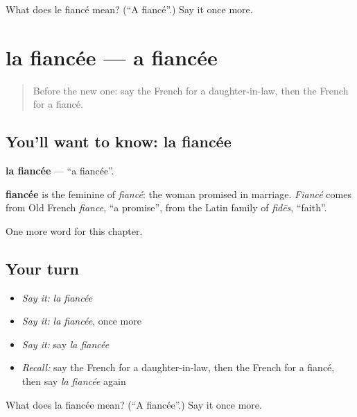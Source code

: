 \begin{tcolorbox}[breakable,colback=teal!4,colframe=teal!35!black,title={Before you move on}]
What does le fiancé mean? (\textquotedblleft{}A fiancé\textquotedblright{}.) Say it once more.
\end{tcolorbox}
\section[la fiancée]{la fiancée — a fiancée}

\label{lesson:FR-C167-fiancee}



\begin{quote}
Before the new one: say the French for a daughter-in-law, then the French for a fiancé.
\end{quote}

\subsection*{You'll want to know: la fiancée}
\textbf{la fiancée} — \textquotedblleft{}a fiancée\textquotedblright{}.

\begin{cousinweb}
\textbf{fiancée} is the feminine of \emph{fiancé}: the woman promised in marriage. \emph{Fiancé} comes from Old French \emph{fiance}, \textquotedblleft{}a promise\textquotedblright{}, from the Latin family of \emph{fidēs}, \textquotedblleft{}faith\textquotedblright{}.
\end{cousinweb}

\begin{grammarlens}[title={What you've built}]
One more word for this chapter.
\end{grammarlens}

\subsection*{Your turn}
\begin{itemize}
\raggedright
  \item \emph{Say it:} \emph{la fiancée}
  \item \emph{Say it:} \emph{la fiancée}, once more
  \item \emph{Say it:} say \emph{la fiancée}
  \item \emph{Recall:} say the French for a daughter-in-law, then the French for a fiancé, then say \emph{la fiancée} again
\end{itemize}

\begin{tcolorbox}[breakable,colback=teal!4,colframe=teal!35!black,title={Before you move on}]
What does la fiancée mean? (\textquotedblleft{}A fiancée\textquotedblright{}.) Say it once more.
\end{tcolorbox}
